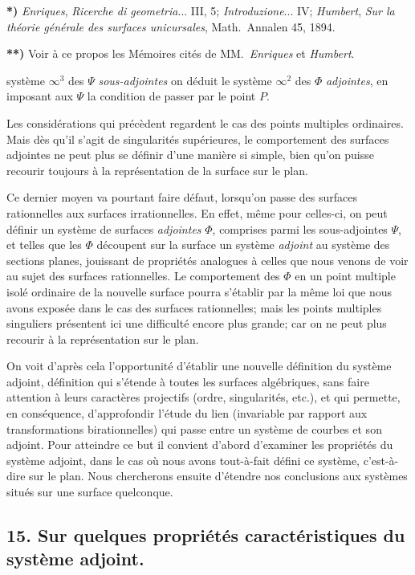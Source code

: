\documentclass{article}
\begin{document}
\textbf{*)} \emph{Enriques}, \emph{Ricerche di geometria}... III, 5; \emph{Introduzione}... IV; \emph{Humbert}, \emph{Sur la théorie générale des surfaces unicursales}, Math.\ Annalen 45, 1894.

\textbf{**)} Voir à ce propos les Mémoires cités de MM.\ \emph{Enriques} et \emph{Humbert}.

système $\infty^{3}$ des $\Psi$ \emph{sous-adjointes} on déduit le système $\infty^{2}$ des $\Phi$ \emph{adjointes}, en imposant aux $\Psi$ la condition de passer par le point $P$.

Les considérations qui précèdent regardent le cas des points multiples ordinaires. Mais dès qu'il s'agit de singularités supérieures, le comportement des surfaces adjointes ne peut plus se définir d'une manière si simple, bien qu'on puisse recourir toujours à la représentation de la surface sur le plan.

Ce dernier moyen va pourtant faire défaut, lorsqu'on passe des surfaces rationnelles aux surfaces irrationnelles. En effet, même pour celles-ci, on peut définir un système de surfaces \emph{adjointes} $\Phi$, comprises parmi les sous-adjointes $\Psi$, et telles que les $\Phi$ découpent sur la surface un système \emph{adjoint} au système des sections planes, jouissant de propriétés analogues à celles que nous venons de voir au sujet des surfaces rationnelles. Le comportement des $\Phi$ en un point multiple isolé ordinaire de la nouvelle surface pourra s'établir par la même loi que nous avons exposée dans le cas des surfaces rationnelles; mais les points multiples singuliers présentent ici une difficulté encore plus grande; car on ne peut plus recourir à la représentation sur le plan.

On voit d'après cela l'opportunité d'établir une nouvelle définition du système adjoint, définition qui s'étende à toutes les surfaces algébriques, sans faire attention à leurs caractères projectifs (ordre, singularités, etc.), et qui permette, en conséquence, d'approfondir l'étude du lien (invariable par rapport aux transformations birationnelles) qui passe entre un système de courbes et son adjoint. Pour atteindre ce but il convient d'abord d'examiner les propriétés du système adjoint, dans le cas où nous avons tout-à-fait défini ce système, c'est-à-dire sur le plan. Nous chercherons ensuite d'étendre nos conclusions aux systèmes situés sur une surface quelconque.

\subsection*{15. Sur quelques propriétés caractéristiques du système adjoint.}
\end{document}
